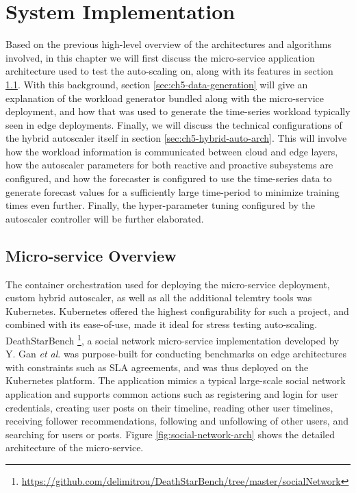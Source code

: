 \clearpage

\def\chaptertitle{System Implementation}

\lhead{\emph{\chaptertitle}}

\chapter{\chaptertitle}
\label{ch:experimental-setup}

Based on the previous high-level overview of the architectures and algorithms involved, in this chapter we will first discuss the micro-service application architecture used to test the auto-scaling on, along with its features in section \ref{sec:ch5-microservice-overview}. With this background, section \ref{sec:ch5-data-generation} will give an explanation of the workload generator bundled along with the micro-service deployment, and how that was used to generate the time-series workload typically seen in edge deployments. Finally, we will discuss the technical configurations of the hybrid autoscaler itself in section \ref{sec:ch5-hybrid-auto-arch}. This will involve how the workload information is communicated between cloud and edge layers, how the autoscaler parameters for both reactive and proactive subsystems are configured, and how the forecaster is configured to use the time-series data to generate forecast values for a sufficiently large time-period to minimize training times even further. Finally, the hyper-parameter tuning configured by the autoscaler controller will be further elaborated.

\section{Micro-service Overview}
\label{sec:ch5-microservice-overview}

The container orchestration used for deploying the micro-service deployment, custom hybrid autoscaler, as well as all the additional telemtry tools was Kubernetes. Kubernetes offered the highest configurability for such a project, and combined with its ease-of-use, made it ideal for stress testing auto-scaling. DeathStarBench \footnote{\url{https://github.com/delimitrou/DeathStarBench/tree/master/socialNetwork}}, a social network micro-service implementation developed by Y. Gan \textit{et al}. \cite{gan2019open} was purpose-built for conducting benchmarks on edge architectures with constraints such as SLA agreements, and was thus deployed on the Kubernetes platform. The application mimics a typical large-scale social network application and supports common actions such as registering and login for user credentials, creating user posts on their timeline, reading other user timelines, receiving follower recommendations, following and unfollowing of other users, and searching for users or posts. Figure \ref{fig:social-network-arch} shows the detailed architecture of the micro-service.\par


